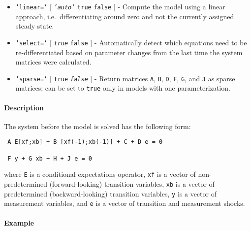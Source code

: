  \begin{itemize}
 \item
   \texttt{'linear='} {[} \emph{\texttt{'auto'}} \textbar{} \texttt{true}
   \textbar{} \texttt{false} {]} - Compute the model using a linear
   approach, i.e.~differentiating around zero and not the currently
   assigned steady state.
 \item
   \texttt{'select='} {[} \emph{\texttt{true}} \textbar{} \texttt{false}
   {]} - Automatically detect which equations need to be
   re-differentiated based on parameter changes from the last time the
   system matrices were calculated.
 \item
   \texttt{'sparse='} {[} \texttt{true} \textbar{} \emph{\texttt{false}}
   {]} - Return matrices \texttt{A}, \texttt{B}, \texttt{D}, \texttt{F},
   \texttt{G}, and \texttt{J} as sparse matrices; can be set to
   \texttt{true} only in models with one parameterization.
 \end{itemize}
 
 \paragraph{Description}
 
 The system before the model is solved has the following form:
 
 \begin{verbatim}
 A E[xf;xb] + B [xf(-1);xb(-1)] + C + D e = 0
 
 F y + G xb + H + J e = 0
 \end{verbatim}
 
 where \texttt{E} is a conditional expectations operator, \texttt{xf} is
 a vector of non-predetermined (forward-looking) transition variables,
 \texttt{xb} is a vector of predetermined (backward-looking) transition
 variables, \texttt{y} is a vector of measurement variables, and
 \texttt{e} is a vector of transition and measurement shocks.
 
 \paragraph{Example}


